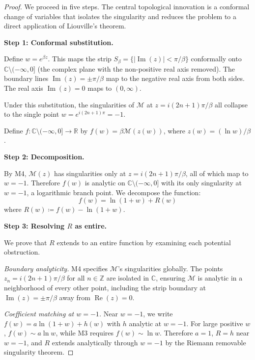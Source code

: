 \documentclass[12pt]{article}
\newcommand{\R}{\mathbb{R}}
\newcommand{\C}{\mathbb{C}}
\newcommand{\Z}{\mathbb{Z}}
\newcommand{\Man}{\mathcal{M}}
\DeclareMathOperator{\ReOp}{Re}
\DeclareMathOperator{\ImOp}{Im}
\theoremstyle{definition}
\theoremstyle{remark}
\begin{document}
\begin{proof}
We proceed in five steps. The central topological innovation is a conformal change of variables that isolates the singularity and reduces the problem to a direct application of Liouville's theorem.

\vspace{6pt}
\noindent\textbf{Step 1: Conformal substitution.}

Define $w = e^{\beta z}$. This maps the strip $S_\beta = \{|\ImOp(z)| < \pi/\beta\}$ conformally onto $\C \setminus (-\infty, 0]$ (the complex plane with the non-positive real axis removed). The boundary lines $\ImOp(z) = \pm\pi/\beta$ map to the negative real axis from both sides. The real axis $\ImOp(z) = 0$ maps to $(0, \infty)$.

Under this substitution, the singularities of $\Man$ at $z = i(2n+1)\pi/\beta$ all collapse to the single point $w = e^{i(2n+1)\pi} = -1$.

Define $f : \C \setminus (-\infty, 0] \to \R$ by $f(w) = \beta \Man(z(w))$, where $z(w) = (\ln w)/\beta$.

\vspace{6pt}
\noindent\textbf{Step 2: Decomposition.}

By M4, $\Man(z)$ has singularities only at $z = i(2n+1)\pi/\beta$, all of which map to $w = -1$. Therefore $f(w)$ is analytic on $\C \setminus (-\infty, 0]$ with its only singularity at $w = -1$, a logarithmic branch point. We decompose the function:
\begin{equation}
\label{eq:decomposition}
    f(w) = \ln(1 + w) + R(w)
\end{equation}
where $R(w) \coloneqq f(w) - \ln(1+w)$.

\vspace{6pt}
\noindent\textbf{Step 3: Resolving $R$ as entire.}

We prove that $R$ extends to an entire function by examining each potential obstruction.

\emph{Boundary analyticity.} M4 specifies $\Man$'s singularities globally. The points $z_n = i(2n+1)\pi/\beta$ for all $n \in \Z$ are isolated in $\C$, ensuring $\Man$ is analytic in a neighborhood of every other point, including the strip boundary at $\ImOp(z) = \pm\pi/\beta$ away from $\ReOp(z) = 0$.

\emph{Coefficient matching at $w = -1$.} Near $w = -1$, we write $f(w) = a \ln(1 + w) + h(w)$ with $h$ analytic at $w = -1$. For large positive $w$, $f(w) \sim a\ln w$, while M3 requires $f(w) \sim \ln w$. Therefore $a = 1$, $R = h$ near $w = -1$, and $R$ extends analytically through $w = -1$ by the Riemann removable singularity theorem.


\end{proof}
\end{document}

